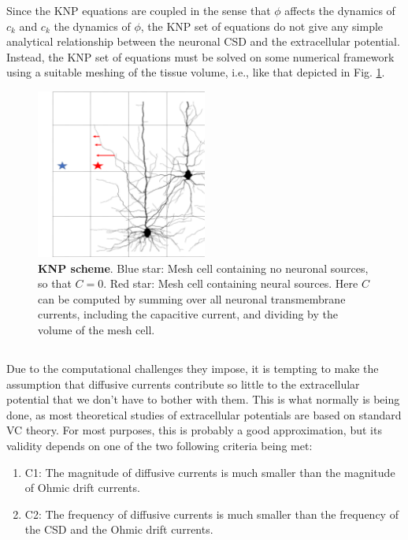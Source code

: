 Since the KNP equations are coupled in the sense that $\phi$ affects the dynamics of $c_k$ and $c_k$ the dynamics of $\phi$, the KNP set of equations do not give any simple analytical relationship between the neuronal CSD and the extracellular potential. Instead, the KNP set of equations must be solved on some numerical framework using a suitable meshing of the tissue volume, i.e., like that depicted in Fig. \ref{Eldiff:fig:KNPmesh}.

\begin{figure}[!ht]
\begin{center}
\includegraphics[width=0.5\textwidth]{Figures/Eldiff/KNP.png}
\end{center}
\caption{\textbf{KNP scheme}. Blue star: Mesh cell containing no neuronal sources, so that $C=0$. Red star: Mesh cell containing neural sources. Here $C$ can be computed by summing over all neuronal transmembrane currents, including the capacitive current, and dividing by the volume of the mesh cell. }
\label{Eldiff:fig:KNPmesh}
\end{figure}


\subsection{}
\label{sec:Eldiff:estimates}
Due to the computational challenges they impose, it is tempting to make the assumption that diffusive currents contribute so little to the extracellular potential that we don't have to bother with them. This is what normally is being done, as most theoretical studies of extracellular potentials are based on standard VC theory. For most purposes, this is probably a good approximation, but its validity depends on one of the two following criteria being met:

\begin{enumerate}
\item C1: The magnitude of diffusive currents is much smaller than the magnitude of Ohmic drift currents.
\item C2: The frequency of diffusive currents is much smaller than the frequency of the CSD and the Ohmic drift currents. 
\end{enumerate}

